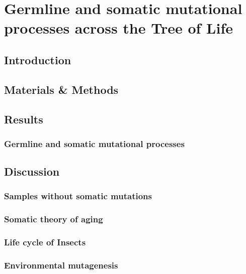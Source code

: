 \chapter{Germline and somatic mutational processes across the Tree of Life}

\ifpdf
    \graphicspath{{Chapter3/Figs/Raster/}{Chapter3/Figs/PDF/}{Chapter3/Figs/}}
\else
    \graphicspath{{Chapter3/Figs/Vector/}{Chapter3/Figs/}}
\fi


\section{Introduction}
\section{Materials \& Methods}
\section{Results}
\subsection{Germline and somatic mutational processes}
\section{Discussion}
\subsection{Samples without somatic mutations}
\subsection{Somatic theory of aging}
\subsection{Life cycle of Insects}
\subsection{Environmental mutagenesis}

